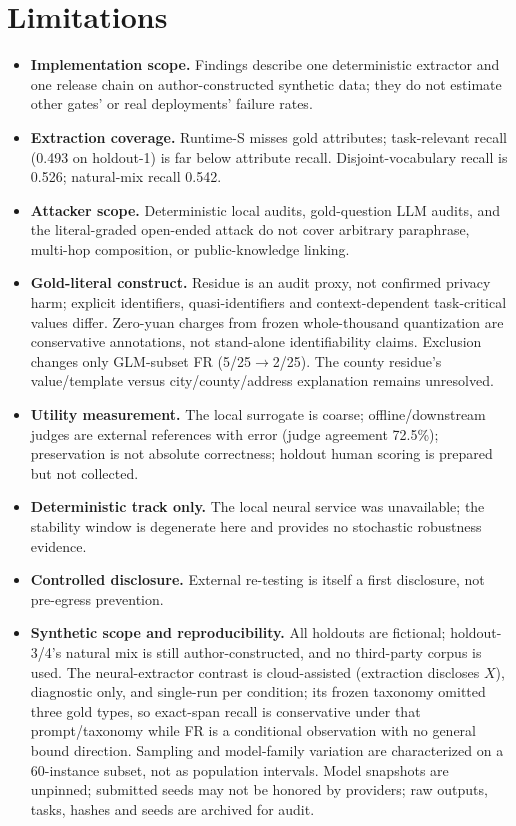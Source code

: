 \documentclass[journal]{IEEEtran}
\begin{document}
\section{Limitations}\label{sec:limitations}
\begin{itemize}
\item \textbf{Implementation scope.} Findings describe one deterministic extractor and one release chain on author-constructed synthetic data; they do not estimate other gates' or real deployments' failure rates.
\item \textbf{Extraction coverage.} Runtime-S misses gold attributes; task-relevant recall (0.493 on holdout-1) is far below attribute recall. Disjoint-vocabulary recall is 0.526; natural-mix recall 0.542.
\item \textbf{Attacker scope.} Deterministic local audits, gold-question LLM audits, and the literal-graded open-ended attack do not cover arbitrary paraphrase, multi-hop composition, or public-knowledge linking.
\item \textbf{Gold-literal construct.} Residue is an audit proxy, not confirmed privacy harm; explicit identifiers, quasi-identifiers and context-dependent task-critical values differ. Zero-yuan charges from frozen whole-thousand quantization are conservative annotations, not stand-alone identifiability claims. Exclusion changes only GLM-subset FR (5/25$\to$2/25). The county residue's value/template versus city/county/address explanation remains unresolved.
\item \textbf{Utility measurement.} The local surrogate is coarse; offline/downstream judges are external references with error (judge agreement 72.5\%); preservation is not absolute correctness; holdout human scoring is prepared but not collected.
\item \textbf{Deterministic track only.} The local neural service was unavailable; the stability window is degenerate here and provides no stochastic robustness evidence.
\item \textbf{Controlled disclosure.} External re-testing is itself a first disclosure, not pre-egress prevention.
\item \textbf{Synthetic scope and reproducibility.} All holdouts are fictional; holdout-3/4's natural mix is still author-constructed, and no third-party corpus is used. The neural-extractor contrast is cloud-assisted (extraction discloses $X$), diagnostic only, and single-run per condition; its frozen taxonomy omitted three gold types, so exact-span recall is conservative under that prompt/taxonomy while FR is a conditional observation with no general bound direction. Sampling and model-family variation are characterized on a 60-instance subset, not as population intervals. Model snapshots are unpinned; submitted seeds may not be honored by providers; raw outputs, tasks, hashes and seeds are archived for audit.
\end{itemize}
\end{document}
